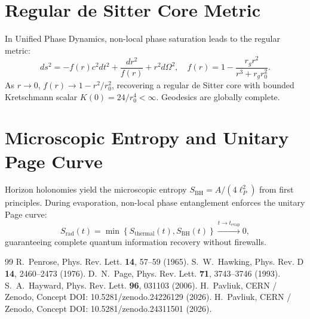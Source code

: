 \documentclass[11pt,a4paper]{article}
\begin{document}
\section{Regular de Sitter Core Metric}
In Unified Phase Dynamics, non-local phase saturation leads to the regular metric:
\begin{equation}
ds^2 = - f(r) c^2 dt^2 + \frac{dr^2}{f(r)} + r^2 d\Omega^2, \quad f(r) = 1 - \frac{r_g r^2}{r^3 + r_g r_0^2}.
\end{equation}
As $r \to 0$, $f(r) \to 1 - r^2 / r_0^2$, recovering a regular de Sitter core with bounded Kretschmann scalar $K(0) = 24 / r_0^4 < \infty$. Geodesics are globally complete.

\section{Microscopic Entropy and Unitary Page Curve}
Horizon holonomies yield the microscopic entropy $S_{\mathrm{BH}} = A / (4\ell_P^2)$ from first principles. During evaporation, non-local phase entanglement enforces the unitary Page curve:
\begin{equation}
S_{\mathrm{rad}}(t) = \min \left\{ S_{\mathrm{thermal}}(t), S_{\mathrm{BH}}(t) \right\} \xrightarrow{t \to t_{\mathrm{evap}}} 0,
\end{equation}
guaranteeing complete quantum information recovery without firewalls.

\begin{thebibliography}{99}
 R.~Penrose, Phys. Rev. Lett. \textbf{14}, 57--59 (1965).
 S.~W.~Hawking, Phys. Rev. D \textbf{14}, 2460--2473 (1976).
 D.~N.~Page, Phys. Rev. Lett. \textbf{71}, 3743--3746 (1993).
 S.~A.~Hayward, Phys. Rev. Lett. \textbf{96}, 031103 (2006).
 H.~Pavliuk, CERN / Zenodo, Concept DOI: 10.5281/zenodo.24226129 (2026).
 H.~Pavliuk, CERN / Zenodo, Concept DOI: 10.5281/zenodo.24311501 (2026).
\end{thebibliography}
\end{document}
